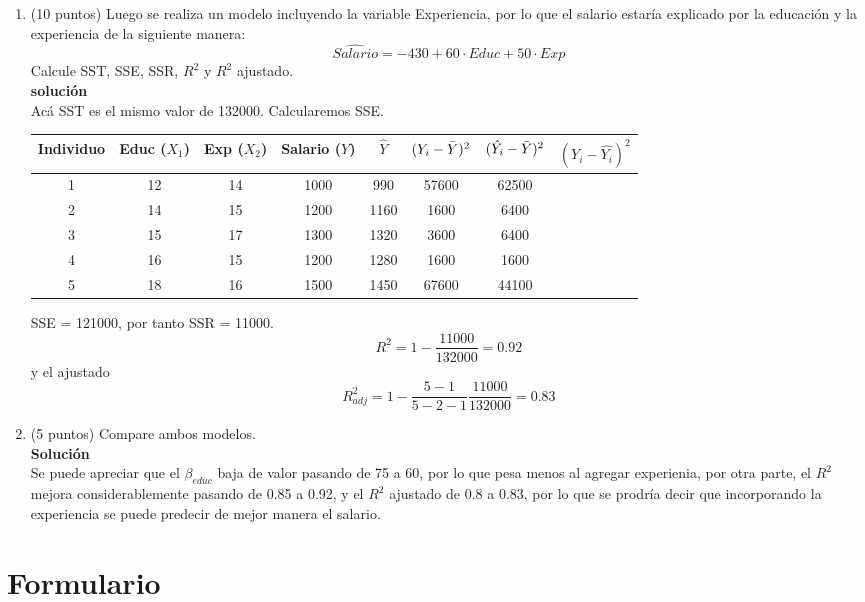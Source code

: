 \documentclass[10pt,a4paper]{article}
\begin{document}
\begin{enumerate}
\begin{enumerate}
\begin{enumerate}
    \item (10 puntos) Luego se realiza un modelo incluyendo la variable Experiencia, por lo que el salario estaría explicado por la educación y la experiencia de la siguiente manera:
    $$\widehat{Salario} = -430 + 60 \cdot Educ + 50 \cdot Exp$$
    Calcule SST, SSE, SSR, $R^2$ y $R^2$ ajustado.
    \\
    \textbf{solución}
    \\
    Acá SST es el mismo valor de 132000. Calcularemos SSE.
    \begin{center}
\begin{tabular}{|c|c|c|c|c|c|c|c|}
\hline
\textbf{Individuo} & \textbf{Educ} ($X_1$) & \textbf{Exp} ($X_2$)  & \textbf{Salario ($Y$)} & $\hat{Y}$ & $(Y_i - \Bar{Y})^2$ & $(\hat{Y_i} - \Bar{Y})^2$ & $(Y_i-\hat{Y_i})^2$\\
\hline
1 & 12 & 14 & 1000 & 990 & 57600 & 62500& \\
2 & 14 & 15 & 1200 & 1160 & 1600  & 6400 & \\
3 & 15 & 17 & 1300 & 1320 & 3600  & 6400& \\
4 & 16 & 15 & 1200 & 1280 & 1600  & 1600& \\
5 & 18 & 16 & 1500 & 1450 & 67600 & 44100& \\
\hline
\end{tabular}
\end{center}
SSE = 121000, por tanto SSR = 11000. 
$$R^2 = 1- \frac{11000}{132000}=0.92$$
y el ajustado
$$R^2_{adj}= 1- \frac{5-1}{5-2-1}\frac{11000}{132000}=0.83$$
    \item (5 puntos) Compare ambos modelos. 
    \\
    \textbf{Solución}
    \\
    Se puede apreciar que el $\beta_{educ}$ baja de valor pasando de 75 a 60, por lo que pesa menos al agregar experienia, por otra parte, el $R^2$ mejora considerablemente pasando de 0.85 a 0.92, y el $R^2$ ajustado de 0.8 a 0.83, por lo que se prodría decir que incorporando la experiencia se puede predecir de mejor manera el salario.
\end{enumerate}

\end{enumerate}



\end{enumerate}

\section{Formulario}
\end{document}
